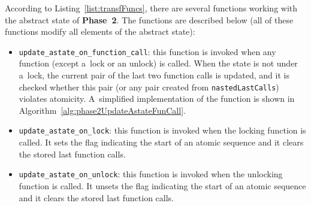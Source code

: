 According to Listing~\ref{list:transfFuncs}, there are several functions
working with the abstract state of \textbf{Phase~2}. The functions are 
described below (all of these functions modify all elements of the 
abstract state):
\begin{itemize}
    \item
        \texttt{update\_astate\_on\_function\_call}: this function is 
        invoked when any function (except a~lock or an unlock) is called.
        When the state is not under a~lock, the current pair of the last 
        two function calls is updated, and it is checked whether this pair 
        (or any pair created from \texttt{nastedLastCalls}) violates 
        atomicity. A~simplified implementation of the function is shown in
        Algorithm~\ref{alg:phase2UpdateAstateFunCall}.

    \item
        \texttt{update\_astate\_on\_lock}: this function is invoked when
        the locking function is called. It sets the flag indicating the 
        start of an atomic sequence and it clears the stored last function
        calls.

    \item
        \texttt{update\_astate\_on\_unlock}: this function is invoked when 
        the unlocking function is called. It unsets the flag indicating the
        start of an atomic sequence and it clears the stored last function
        calls.
\end{itemize}

\begin{algorithm}[hbt]



    \caption{%
        A~simplified algorithm of updating the abstract state by the 
        called function and a~check for atomicity violations
    }
    \label{alg:phase2UpdateAstateFunCall}
\end{algorithm}


